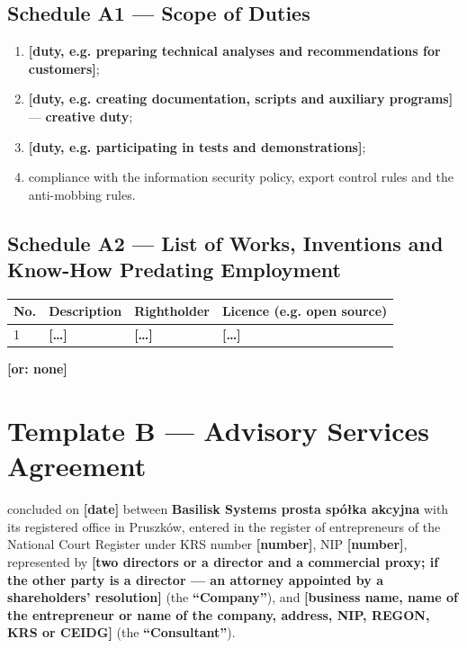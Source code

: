 \documentclass[11pt,a4paper]{report}
\newcounter{paragraf}
\newcommand{\field}[1]{\textbf{[#1]}}
\newcommand{\CompanyFull}{Basilisk Systems prosta spółka akcyjna}
\newcommand{\Strony}{\textbf{\CompanyFull{}} with its registered office in Pruszków, entered in the register of entrepreneurs of the National Court Register under KRS number \field{number}, NIP \field{number}, represented by \field{two directors or a director and a commercial proxy; if the other party is a director --- an attorney appointed by a shareholders' resolution}}
\begin{document}
\section*{Schedule A1 --- Scope of Duties}
\begin{enumerate}
  \item \field{duty, e.g. preparing technical analyses and recommendations for customers};
  \item \field{duty, e.g. creating documentation, scripts and auxiliary programs} --- \textbf{creative duty};
  \item \field{duty, e.g. participating in tests and demonstrations};
  \item compliance with the information security policy, export control rules and the anti-mobbing rules.
\end{enumerate}

\section*{Schedule A2 --- List of Works, Inventions and Know-How Predating Employment}
\begin{center}
\begin{tabularx}{\linewidth}{@{}p{0.8cm} X p{3.4cm} p{3.4cm}@{}}
\toprule
\textbf{No.} & \textbf{Description} & \textbf{Rightholder} & \textbf{Licence (e.g. open source)} \\
\midrule
1 & \field{\ldots} & \field{\ldots} & \field{\ldots} \\
\bottomrule
\end{tabularx}
\end{center}
\field{or: none}

\chapter*{Template B --- Advisory Services Agreement}
\setcounter{paragraf}{0}

concluded on \field{date} between \Strony{} (the \textbf{``Company''}), and \field{business name, name of the entrepreneur or name of the company, address, NIP, REGON, KRS or CEIDG} (the \textbf{``Consultant''}).
\end{document}

